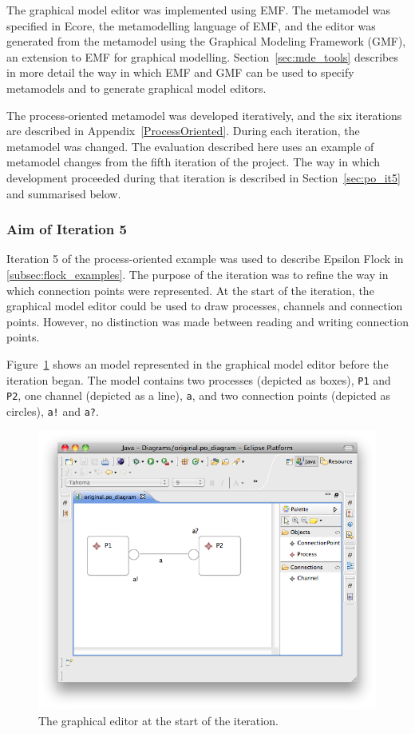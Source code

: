 The graphical model editor was implemented using EMF. The metamodel was specified in Ecore, the metamodelling language of EMF, and the editor was generated from the metamodel using the Graphical Modeling Framework (GMF), an extension to EMF for graphical modelling. Section~\ref{sec:mde_tools} describes in more detail the way in which EMF and GMF can be used to specify metamodels and to generate graphical model editors.

The process-oriented metamodel was developed iteratively, and the six iterations are described in Appendix~\ref{ProcessOriented}. During each iteration, the metamodel was changed. The evaluation described here uses an example of metamodel changes from the fifth iteration of the project. The way in which development proceeded during that iteration is described in Section~\ref{sec:po_it5} and summarised below.

\subsubsection{Aim of Iteration 5}
Iteration 5 of the process-oriented example was used to describe Epsilon Flock in \ref{subsec:flock_examples}. The purpose of the iteration was to refine the way in which connection points were represented. At the start of the iteration, the graphical model editor could be used to draw processes, channels and connection points. However, no distinction was made between reading and writing connection points.

Figure~\ref{fig:po_original_editor} shows an model represented in the graphical model editor before the iteration began. The model contains two processes (depicted as boxes), \texttt{P1} and \texttt{P2}, one channel (depicted as a line), \texttt{a}, and two connection points (depicted as circles), \texttt{a!} and \texttt{a?}.

\begin{figure}[htbp]
	\centering
	\includegraphics[width=13.5cm]{6.Evaluation/images/user_driven/po_original_editor.png}
	\caption{The graphical editor at the start of the iteration.}
	\label{fig:po_original_editor}
\end{figure}


